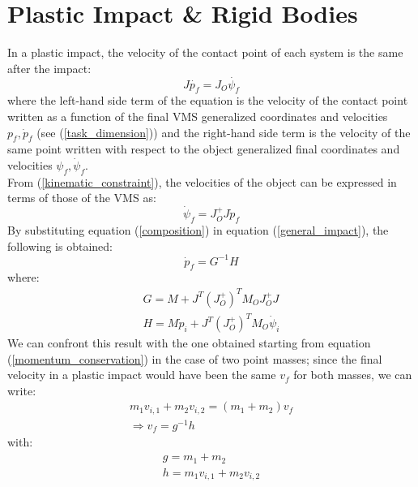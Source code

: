 \documentclass[a4paper,12pt,oneside]{report}
\begin{document}
\section{Plastic Impact \& Rigid Bodies}
In a plastic impact, the velocity of the contact point of each system is the same after the impact:
\begin{equation}
  J\dot{p_f}=J_O\dot{\psi_f}
  \label{kinematic_constraint}
\end{equation}
where the left-hand side term of the equation is the velocity of the contact point written as a function of the final VMS generalized coordinates and velocities $p_f,\dot{p}_f$ (see (\ref{task_dimension})) and the right-hand side term is the velocity of the same point written with respect to the object generalized final coordinates and velocities $\psi_f,\dot{\psi}_f$.\\
From (\ref{kinematic_constraint}), the velocities of the object can be expressed in terms of those of the VMS as:
\begin{equation}
  \dot{\psi}_f=J_O^+J\dot{p}_f
  \label{composition}
\end{equation}
By substituting equation (\ref{composition}) in equation (\ref{general_impact}), the following is obtained:
\begin{equation}
  \dot{p}_f=G^{-1}H
  \label{final_velocities}
\end{equation}
where:
\begin{equation}
  \begin{array}{l}
    G=M+J^T(J_O^+)^TM_OJ_O^+J\\
    H=M\dot{p}_i+J^T(J_O^+)^TM_O\dot{\psi}_i
  \end{array}
\end{equation}
We can confront this result with the one obtained starting from equation (\ref{momentum_conservation}) in the case of two point masses; since the final velocity in a plastic impact would have been the same $v_f$ for both masses, we can write:
\begin{equation}
  \begin{array}{l}
  m_1v_{i,1}+m_2v_{i,2}=(m_1+m_2)v_f\\
  \Rightarrow v_f=g^{-1}h
  \end{array}
\end{equation}
with:
\begin{equation}
  \begin{array}{l}
    g=m_1+m_2\\
    h=m_1v_{i,1}+m_2v_{i,2}
  \end{array}
\end{equation}
\end{document}
